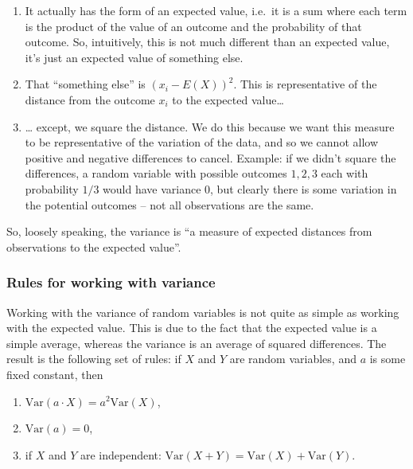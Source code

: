 \documentclass[]{book}
\providecommand{\tightlist}{%
  \setlength{\itemsep}{0pt}\setlength{\parskip}{0pt}}
\theoremstyle{definition}
\theoremstyle{definition}
\theoremstyle{definition}
\theoremstyle{remark}
\begin{document}
\begin{enumerate}
\def\labelenumi{\arabic{enumi}.}
\tightlist
\item
  It actually has the form of an expected value, i.e.~it is a sum where each term is the product of the value of an outcome and the probability of that outcome. So, intuitively, this is not much different than an expected value, it's just an expected value of something else.
\item
  That ``something else'' is \((x_i - E(X))^2\). This is representative of the distance from the outcome \(x_i\) to the expected value\ldots{}
\item
  \ldots{} except, we square the distance. We do this because we want this measure to be representative of the variation of the data, and so we cannot allow positive and negative differences to cancel. Example: if we didn't square the differences, a random variable with possible outcomes \(1,2,3\) each with probability \(1/3\) would have variance \(0\), but clearly there is some variation in the potential outcomes -- not all observations are the same.
\end{enumerate}

So, loosely speaking, the variance is ``a measure of expected distances from observations to the expected value''.

\hypertarget{rules-for-working-with-variance}{%
\subsubsection{Rules for working with variance}\label{rules-for-working-with-variance}}

Working with the variance of random variables is not quite as simple as working with the expected value. This is due to the fact that the expected value is a simple average, whereas the variance is an average of squared differences. The result is the following set of rules: if \(X\) and \(Y\) are random variables, and \(a\) is some fixed constant, then

\begin{enumerate}
\def\labelenumi{\arabic{enumi}.}
\tightlist
\item
  \(\text{Var}(a\cdot X) = a^2 \text{Var}(X)\),
\item
  \(\text{Var}(a) = 0\),
\item
  if \(X\) and \(Y\) are independent: \(\text{Var}(X+Y) = \text{Var}(X) + \text{Var}(Y)\).
\end{enumerate}
\end{document}
